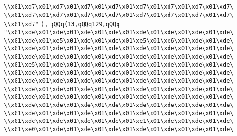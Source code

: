 \verb|\\x01\xd7\x01\xd7\x01\xd7\x01\xd7\x01\xd7\x01\xd7\x01\xd7\x01\xd7\|\newline
\verb|\\x01\xd7\x01\xd7\x01\xd7\x01\xd7\x01\xd7\x01\xd7\x01\xd7\x01\xd7\|\newline
\verb|\\x01\xd7"|\newline
\verb|),|\newline
\verb|qQQq(13,qQQq129,qQQq|\newline
\verb|"\x01\xde\x01\xde\x01\xde\x01\xde\x01\xde\x01\xde\x01\xde\x01\xde\|\newline
\verb|\\x01\xde\x01\xe5\x01\xde\x01\xde\x01\xe5\x01\xe6\x01\xde\x01\xde\|\newline
\verb|\\x01\xde\x01\xde\x01\xde\x01\xde\x01\xde\x01\xde\x01\xde\x01\xde\|\newline
\verb|\\x01\xde\x01\xde\x01\xde\x01\xde\x01\xde\x01\xde\x01\xde\x01\xde\|\newline
\verb|\\x01\xe5\x01\xde\x01\xdd\x01\xde\x01\xde\x01\xde\x01\xde\x01\xde\|\newline
\verb|\\x01\xde\x01\xde\x01\xde\x01\xde\x01\xde\x01\xde\x01\xde\x01\xde\|\newline
\verb|\\x01\xde\x01\xde\x01\xde\x01\xde\x01\xde\x01\xde\x01\xde\x01\xde\|\newline
\verb|\\x01\xde\x01\xde\x01\xde\x01\xde\x01\xde\x01\xde\x01\xde\x01\xde\|\newline
\verb|\\x01\xde\x01\xde\x01\xde\x01\xde\x01\xde\x01\xde\x01\xde\x01\xde\|\newline
\verb|\\x01\xde\x01\xde\x01\xde\x01\xde\x01\xde\x01\xde\x01\xde\x01\xde\|\newline
\verb|\\x01\xde\x01\xde\x01\xde\x01\xde\x01\xde\x01\xde\x01\xde\x01\xde\|\newline
\verb|\\x01\xde\x01\xde\x01\xde\x01\xde\x01\xe1\x01\xde\x01\xde\x01\xde\|\newline
\verb|\\x01\xe0\x01\xde\x01\xde\x01\xde\x01\xde\x01\xde\x01\xde\x01\xde\|\newline
